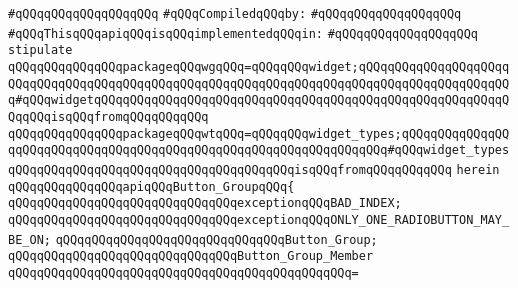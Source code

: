 \verb|#qQQqqQQqqQQqqQQqqQQq|\newline
\newline
\newline
\verb|#qQQqCompiledqQQqby:|\newline
\verb|#qQQqqQQqqQQqqQQqqQQq|\newline
\newline
\verb|#qQQqThisqQQqapiqQQqisqQQqimplementedqQQqin:|\newline
\verb|#qQQqqQQqqQQqqQQqqQQq|\newline
\newline
\newline
\verb|stipulate|\newline
\verb|qQQqqQQqqQQqqQQqpackageqQQqwgqQQq=qQQqqQQqwidget;qQQqqQQqqQQqqQQqqQQqqQQqqQQqqQQqqQQqqQQqqQQqqQQqqQQqqQQqqQQqqQQqqQQqqQQqqQQqqQQqqQQqqQQqqQQq#qQQqwidgetqQQqqQQqqQQqqQQqqQQqqQQqqQQqqQQqqQQqqQQqqQQqqQQqqQQqqQQqqQQqqQQqisqQQqfromqQQqqQQqqQQq|\newline
\verb|qQQqqQQqqQQqqQQqpackageqQQqwtqQQq=qQQqqQQqwidget_types;qQQqqQQqqQQqqQQqqQQqqQQqqQQqqQQqqQQqqQQqqQQqqQQqqQQqqQQqqQQqqQQqqQQq#qQQqwidget_typesqQQqqQQqqQQqqQQqqQQqqQQqqQQqqQQqqQQqqQQqisqQQqfromqQQqqQQqqQQq|\newline
\verb|herein|\newline
\newline
\verb|qQQqqQQqqQQqqQQqapiqQQqButton_GroupqQQq{|\newline
\newline
\verb|qQQqqQQqqQQqqQQqqQQqqQQqqQQqqQQqexceptionqQQqBAD_INDEX;|\newline
\verb|qQQqqQQqqQQqqQQqqQQqqQQqqQQqqQQqexceptionqQQqONLY_ONE_RADIOBUTTON_MAY_BE_ON;|\newline
\newline
\verb|qQQqqQQqqQQqqQQqqQQqqQQqqQQqqQQqButton_Group;|\newline
\newline
\verb|qQQqqQQqqQQqqQQqqQQqqQQqqQQqqQQqButton_Group_Member|\newline
\verb|qQQqqQQqqQQqqQQqqQQqqQQqqQQqqQQqqQQqqQQqqQQqqQQq=|\newline
